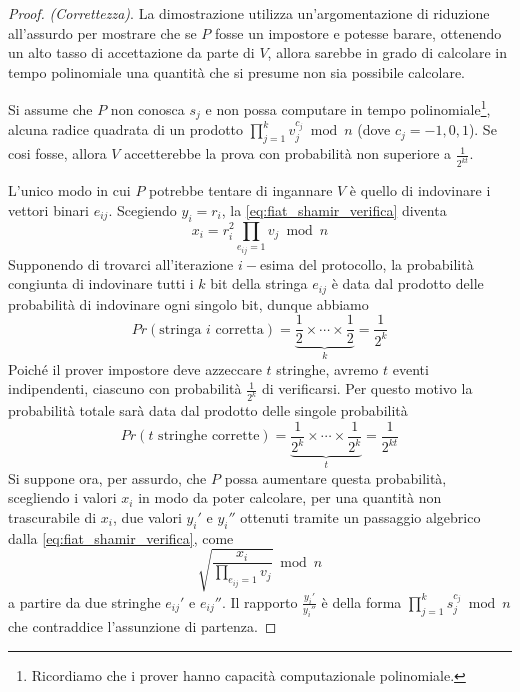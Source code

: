 \documentclass{article}
\theoremstyle{definition}
\begin{document}
\begin{proof}
    \emph{(Correttezza)}.
    La dimostrazione utilizza un'argomentazione di riduzione all'assurdo per mostrare che se $P$ fosse un impostore e potesse barare, ottenendo un alto tasso di accettazione da parte di $V$, allora sarebbe in grado di calcolare in tempo polinomiale una quantità che si presume non sia possibile calcolare.

    Si assume che $P$ non conosca $s_j$ e non possa computare in tempo polinomiale\footnote{Ricordiamo che i prover hanno capacità computazionale polinomiale.}, alcuna radice quadrata di un prodotto $\prod_{j=1}^k v_j^{c_j} \bmod n$ (dove $c_j = -1, 0, 1$). Se cosi fosse, allora $V$ accetterebbe la prova con probabilità non superiore a $\frac{1}{2^{kt}}$.

    L'unico modo in cui $P$ potrebbe tentare di ingannare $V$ è quello di indovinare i vettori binari $e_{ij}$. Scegiendo $y_i = r_i$, la \ref{eq:fiat_shamir_verifica} diventa
    \begin{equation*}
        x_i = r_i^2 \prod_{e_{ij} = 1} v_j \bmod n
    \end{equation*}
    Supponendo di trovarci all'iterazione $i-$esima del protocollo, la probabilità congiunta di indovinare tutti i $k$ bit della stringa $e_{ij}$ è data dal prodotto delle probabilità di indovinare ogni singolo bit, dunque abbiamo
    \begin{equation*}
        Pr(\text{stringa } i \text{ corretta}) = \underbrace{\frac{1}{2} \times \cdots \times \frac{1}{2}}_{k} = \frac{1}{2^k}
    \end{equation*} 
    Poiché il prover impostore deve azzeccare $t$ stringhe, avremo $t$ eventi indipendenti, ciascuno con probabilità $\frac{1}{2^k}$ di verificarsi. Per questo motivo la probabilità totale sarà data dal prodotto delle singole probabilità
    \begin{equation*}
        Pr(t \text{ stringhe corrette}) = \underbrace{\frac{1}{2^k} \times \cdots \times \frac{1}{2^k}}_{t} = \frac{1}{2^{kt}}
    \end{equation*} 
    Si suppone ora, per assurdo, che $P$ possa aumentare questa probabilità, scegliendo i valori $x_i$ in modo da poter calcolare, per una quantità non trascurabile di $x_i$, due valori $y_i'$ e $y_i''$ ottenuti tramite un passaggio algebrico dalla \ref{eq:fiat_shamir_verifica}, come
    \begin{equation*}
        \sqrt{\frac{x_i}{\prod_{e_{ij} = 1} v_j}} \bmod n
    \end{equation*}
    a partire da due stringhe $e_{ij}'$ e $e_{ij}''$. Il rapporto $\frac{y_i'}{y_i''}$ è della forma $\prod_{j=1}^k s_j^{c_j} \bmod n$ che contraddice l'assunzione di partenza. 
\end{proof}
\end{document}
